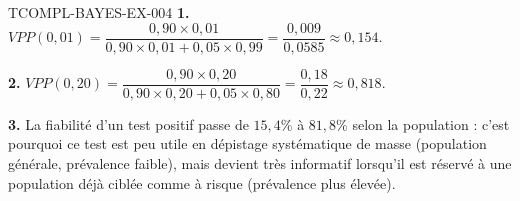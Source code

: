 \begin{corrige}{TCOMPL-BAYES-EX-004}
\textbf{1.} $VPP(0{,}01) = \dfrac{0{,}90\times0{,}01}{0{,}90\times0{,}01+0{,}05\times0{,}99} = \dfrac{0{,}009}{0{,}0585} \approx 0{,}154$.

\textbf{2.} $VPP(0{,}20) = \dfrac{0{,}90\times0{,}20}{0{,}90\times0{,}20+0{,}05\times0{,}80} = \dfrac{0{,}18}{0{,}22} \approx 0{,}818$.

\textbf{3.} La fiabilité d'un test positif passe de $15{,}4\%$ à $81{,}8\%$ selon la population : c'est pourquoi ce test est peu utile en dépistage systématique de masse (population générale, prévalence faible), mais devient très informatif lorsqu'il est réservé à une population déjà ciblée comme à risque (prévalence plus élevée).
\end{corrige}
